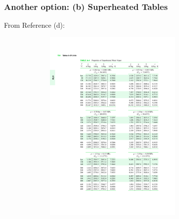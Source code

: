 \documentclass[10pt,compress,handout,ignorenonframetext]{beamer}
\begin{document}
\begin{frame}
  \frametitle{Another option: (b) Superheated Tables}
\scriptsize{From Reference (d):}\vspace{-.8cm}
   \begin{center}
   \begin{figure}
      \includegraphics[width=9.5cm,height=9.5cm,clip]{./Pics/Water_SuperheatedTable}
   \end{figure}
   \end{center}
\end{frame}
\end{document}
